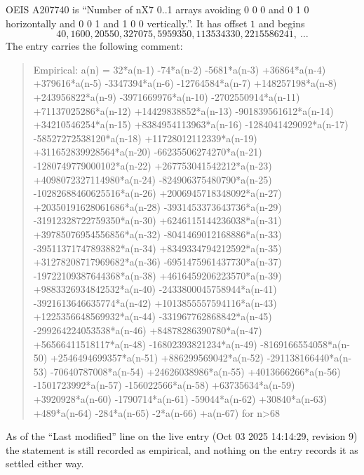\documentclass[11pt,a4paper]{article}
\theoremstyle{plain}
\theoremstyle{definition}
\begin{document}
OEIS A207740 is ``Number of nX7 0..1 arrays avoiding 0 0 0 and 0 1 0 horizontally and 0 0 1 and 1 0 0 vertically.''. It has offset
$1$ and begins
\[
40, 1600, 20550, 327075, 5959350, 113534330, 2215586241,\ \dots
\]
The entry carries the following comment:
\begin{quote}\small
Empirical: a(n) = 32*a(n-1) -74*a(n-2) -5681*a(n-3) +36864*a(n-4) +379616*a(n-5) -3347394*a(n-6) -12764584*a(n-7) +148257198*a(n-8) +243956822*a(n-9) -3971669976*a(n-10) -2702550914*a(n-11) +71137025286*a(n-12) +14429838852*a(n-13) -901839561612*a(n-14) +34210546254*a(n-15) +8384954113963*a(n-16) -1284041429092*a(n-17) -58527272538120*a(n-18) +11728012112339*a(n-19) +311652839928564*a(n-20) -66235506274270*a(n-21) -1280749779000102*a(n-22) +267753041542212*a(n-23) +4098072327114980*a(n-24) -824906375480790*a(n-25) -10282688460625516*a(n-26) +2006945718348092*a(n-27) +20350191628061686*a(n-28) -3931453373643736*a(n-29) -31912328722759350*a(n-30) +6246115144236038*a(n-31) +39785076954556856*a(n-32) -8041469012168886*a(n-33) -39511371747893882*a(n-34) +8349334794212592*a(n-35) +31278208717969682*a(n-36) -6951475961437730*a(n-37) -19722109387644368*a(n-38) +4616459206223570*a(n-39) +9883326934842532*a(n-40) -2433800045758944*a(n-41) -3921613646635774*a(n-42) +1013855557594116*a(n-43) +1225356648569932*a(n-44) -331967762868842*a(n-45) -299264224053538*a(n-46) +84878286390780*a(n-47) +56566411518117*a(n-48) -16802393821234*a(n-49) -8169166554058*a(n-50) +2546494699357*a(n-51) +886299569042*a(n-52) -291138166440*a(n-53) -70640787008*a(n-54) +24626038986*a(n-55) +4013666266*a(n-56) -1501723992*a(n-57) -156022566*a(n-58) +63735634*a(n-59) +3920928*a(n-60) -1790714*a(n-61) -59044*a(n-62) +30840*a(n-63) +489*a(n-64) -284*a(n-65) -2*a(n-66) +a(n-67) for n>68
\end{quote}
As of the ``Last modified'' line on the live entry (Oct 03 2025 14:14:29, revision
9) the statement is still recorded as empirical, and nothing on the entry
records it as settled either way.
\end{document}
